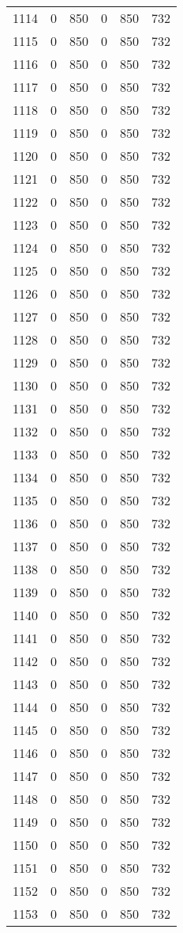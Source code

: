 \documentclass[a4paper]{ctexart}
\begin{document}
\begin{longtable}{p{1cm}|p{2cm}|p{2cm}|p{2cm}|P{2cm}|p{2cm}}
		1114&0&850&0&850&732\\
		1115&0&850&0&850&732\\
		1116&0&850&0&850&732\\
		1117&0&850&0&850&732\\
		1118&0&850&0&850&732\\
		1119&0&850&0&850&732\\
		1120&0&850&0&850&732\\
		1121&0&850&0&850&732\\
		1122&0&850&0&850&732\\
		1123&0&850&0&850&732\\
		1124&0&850&0&850&732\\
		1125&0&850&0&850&732\\
		1126&0&850&0&850&732\\
		1127&0&850&0&850&732\\
		1128&0&850&0&850&732\\
		1129&0&850&0&850&732\\
		1130&0&850&0&850&732\\
		1131&0&850&0&850&732\\
		1132&0&850&0&850&732\\
		1133&0&850&0&850&732\\
		1134&0&850&0&850&732\\
		1135&0&850&0&850&732\\
		1136&0&850&0&850&732\\
		1137&0&850&0&850&732\\
		1138&0&850&0&850&732\\
		1139&0&850&0&850&732\\
		1140&0&850&0&850&732\\
		1141&0&850&0&850&732\\
		1142&0&850&0&850&732\\
		1143&0&850&0&850&732\\
		1144&0&850&0&850&732\\
		1145&0&850&0&850&732\\
		1146&0&850&0&850&732\\
		1147&0&850&0&850&732\\
		1148&0&850&0&850&732\\
		1149&0&850&0&850&732\\
		1150&0&850&0&850&732\\
		1151&0&850&0&850&732\\
		1152&0&850&0&850&732\\
		1153&0&850&0&850&732\\

\end{longtable}
\end{document}
